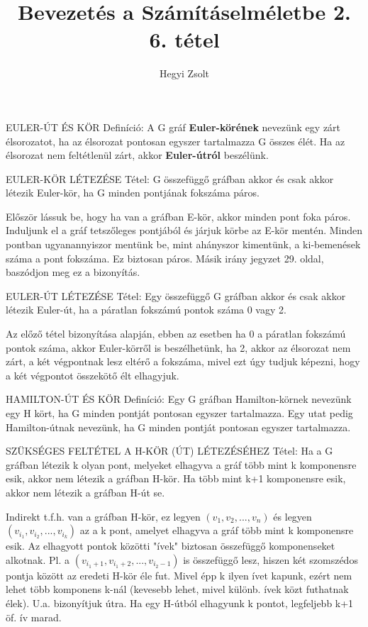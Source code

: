 \documentclass[]{article}
\title{Bevezetés a Számításelméletbe 2.\\{\large 6. tétel}}
\author{Hegyi Zsolt}
\begin{document}
\maketitle
\begin{shaded}
EULER-ÚT ÉS KÖR Definíció: A G gráf \textbf{Euler-körének} nevezünk egy zárt élsorozatot, ha az élsorozat pontosan egyszer tartalmazza G összes élét. Ha az élsorozat nem feltétlenül zárt, akkor \textbf{Euler-útról} beszélünk.
\end{shaded}
\begin{framed}
EULER-KÖR LÉTEZÉSE Tétel: G összefüggő gráfban akkor és csak akkor létezik Euler-kör, ha G minden pontjának fokszáma páros.
\end{framed}
\begin{leftbar}
Először lássuk be, hogy ha van a gráfban E-kör, akkor minden pont foka páros. Induljunk el a gráf tetszőleges pontjából és járjuk körbe az E-kör mentén. Minden pontban ugyanannyiszor mentünk be, mint ahányszor kimentünk, a ki-bemenések száma a pont fokszáma. Ez biztosan páros. Másik irány jegyzet 29. oldal, baszódjon meg ez a bizonyítás.
\end{leftbar}
\begin{framed}
EULER-ÚT LÉTEZÉSE Tétel: Egy összefüggő G gráfban akkor és csak akkor létezik Euler-út, ha a páratlan fokszámú pontok száma 0 vagy 2.
\end{framed}
\begin{leftbar}
Az előző tétel bizonyítása alapján, ebben az esetben ha 0 a páratlan fokszámú pontok száma, akkor Euler-körről is beszélhetünk, ha 2, akkor az élsorozat nem zárt, a két végpontnak lesz eltérő a fokszáma, mivel ezt úgy tudjuk képezni, hogy a két végpontot összekötő élt elhagyjuk.
\end{leftbar}
\begin{shaded}
HAMILTON-ÚT ÉS KÖR Definíció: Egy G gráfban Hamilton-körnek nevezünk egy H kört, ha G minden pontját pontosan egyszer tartalmazza. Egy utat pedig Hamilton-útnak nevezünk, ha G minden pontját pontosan egyszer tartalmazza.
\end{shaded}
\begin{framed}
SZÜKSÉGES FELTÉTEL A H-KÖR (ÚT) LÉTEZÉSÉHEZ Tétel: Ha a G gráfban létezik k olyan pont, melyeket elhagyva a gráf több mint k komponensre esik, akkor nem létezik a gráfban H-kör. Ha több mint k+1 komponensre esik, akkor nem létezik a gráfban H-út se.
\end{framed}
\begin{leftbar}
Indirekt t.f.h. van a gráfban H-kör, ez legyen $(v_1, v_2,..., v_n)$ és legyen $(v_{i_1}, v_{i_2},...,v_{i_k})$ az a k pont, amelyet elhagyva a gráf több mint k komponensre esik. Az elhagyott pontok közötti "ívek" biztosan összefüggő komponenseket alkotnak. Pl. a $(v_{i_{1}+1}, v_{i_{1}+2},..., v_{i_{2}-1})$ is összefüggő lesz, hiszen két szomszédos pontja között az eredeti H-kör éle fut. Mivel épp k ilyen ívet kapunk, ezért nem lehet több komponens k-nál (kevesebb lehet, mivel különb. ívek közt futhatnak élek). U.a. bizonyítjuk útra. Ha egy H-útból elhagyunk k pontot, legfeljebb k+1 öf. ív marad.
\end{leftbar}
\end{document}
